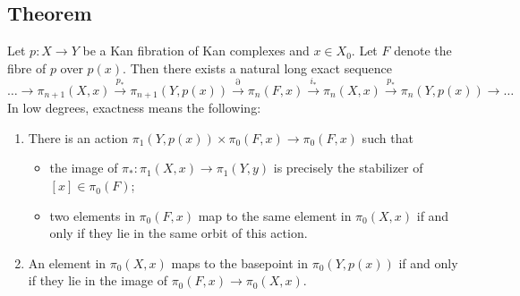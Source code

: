     \subsection{Theorem}\label{chV-3-8}
        Let $p \colon X \to Y$ be a Kan fibration of Kan complexes and $x \in X_0$. Let $F$ denote the fibre of $p$ over $p(x)$. Then there exists a natural long exact sequence
        \begin{equation*}
            \ldots \rightarrow \pi_{n+1}(X,x) \xrightarrow{p_{*}} \pi_{n+1}(Y, p(x)) \xrightarrow{\partial} \pi_n(F,x) \xrightarrow{i_{*}} \pi_n(X,x) \xrightarrow{p_{*}} \pi_n(Y, p(x)) \rightarrow \ldots 
        \end{equation*}
        In low degrees, exactness means the following:
        \begin{enumerate}[label=\roman*)]
            \item 
                There is an action $\pi_1(Y, p(x)) \times \pi_0(F, x) \to \pi_0(F, x)$ such that
                \begin{itemize}
                    \item 
                        the image of $\pi_{*} \colon \pi_1(X, x) \to \pi_1(Y,y)$ is precisely the stabilizer of $[x] \in \pi_0(F)$;
                    \item 
                        two elements in $\pi_0(F,x)$ map to the same element in $\pi_0(X, x)$ if and only if they lie in the same orbit of this action.
                \end{itemize}
            \item 
                An element in $\pi_0(X, x)$ maps to the basepoint in $\pi_0(Y, p(x))$ if and only if they lie in the image of $\pi_0(F, x) \to \pi_0(X, x)$.
        \end{enumerate}
        \smallskip

